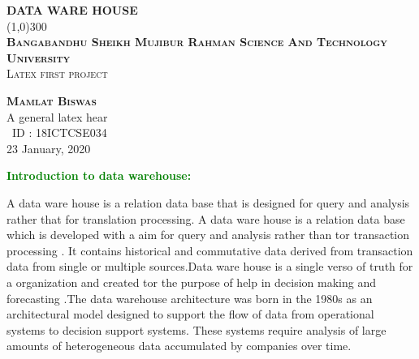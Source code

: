 \documentclass{article}
\begin{document}
 \begin{titlepage}
 \pagecolor{red}
 \begin{center}
 \huge{\bfseries  DATA WARE HOUSE}\\
 [4mm]
 \line(1,0){300}\\
 [0.5cm]
 \textsc{\bfseries Bangabandhu Sheikh Mujibur Rahman Science And Technology University}\\

 \textsc{\large Latex first project}\\
 [10cm]
 \end{center}
 \begin{flushright}
 \textsc{\bfseries Mamlat Biswas\\}
 A general latex hear\\
 \ ID : 18ICTCSE034\\
 23 January, 2020\\
 \end{flushright}
 \end{titlepage}
 \pagecolor{white}
 \tableofcontents
 
\pagecolor{white}
 
 
      \textcolor{green}{\huge{\bfseries Introduction to data warehouse:}\\}  
  
  
A data ware house is a relation data base that is designed for query and analysis rather that for translation processing.
 A data ware house is a relation data base which is developed with a aim for query and analysis rather than tor transaction processing . It contains historical and commutative data derived from transaction data from single or multiple sources.Data ware house is a single  verso of truth for a  organization and created tor the purpose of help in decision making  and forecasting .The data warehouse architecture was born in the 1980s as an architectural model designed to support the flow of data from operational systems to decision support systems. These systems require analysis of large amounts of heterogeneous data accumulated by companies over time.
\end{document}
